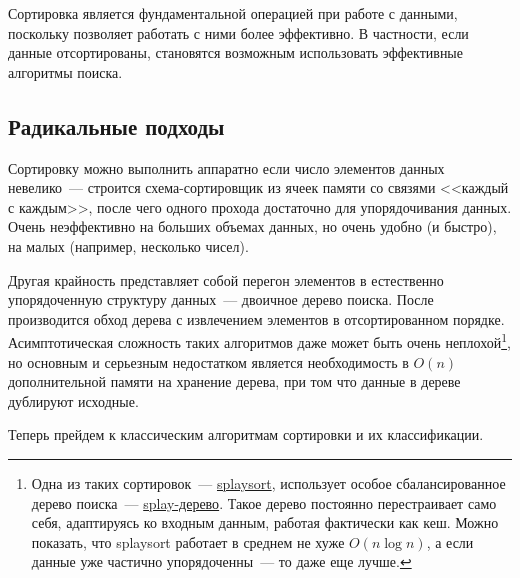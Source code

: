 Сортировка является фундаментальной операцией при работе с данными, поскольку позволяет работать с ними более
эффективно. В частности, если данные отсортированы, становятся возможным использовать эффективные алгоритмы поиска.

\subsection{Радикальные подходы}
Сортировку можно выполнить аппаратно если число элементов данных невелико~--- строится схема-сортировщик из ячеек памяти
со связями <<каждый с каждым>>, после чего одного прохода достаточно для упорядочивания данных. Очень
неэффективно на больших объемах данных, но очень удобно (и быстро), на малых (например, несколько чисел).

Другая крайность представляет собой перегон элементов в естественно упорядоченную структуру данных~--- двоичное дерево поиска.
После производится обход дерева с извлечением элементов в отсортированном порядке.
Асимптотическая сложность таких алгоритмов даже может быть очень неплохой\footnote{
  Одна из таких сортировок~--- \href{https://en.wikipedia.org/wiki/Splaysort}{splaysort}, использует особое
  сбалансированное дерево поиска~--- \href{https://en.wikipedia.org/wiki/Splay_tree}{splay-дерево}. Такое дерево постоянно перестраивает
  само себя, адаптируясь ко входным данным, работая фактически как кеш. Можно показать, что splaysort работает в среднем не хуже
  \(O(n\log{n})\), а если данные уже частично упорядоченны~--- то даже еще лучше.
}, но основным и серьезным недостатком является
необходимость в \(O(n)\) дополнительной памяти на хранение дерева, при том что данные в дереве дублируют исходные.

Теперь прейдем к классическим алгоритмам сортировки и их классификации.
